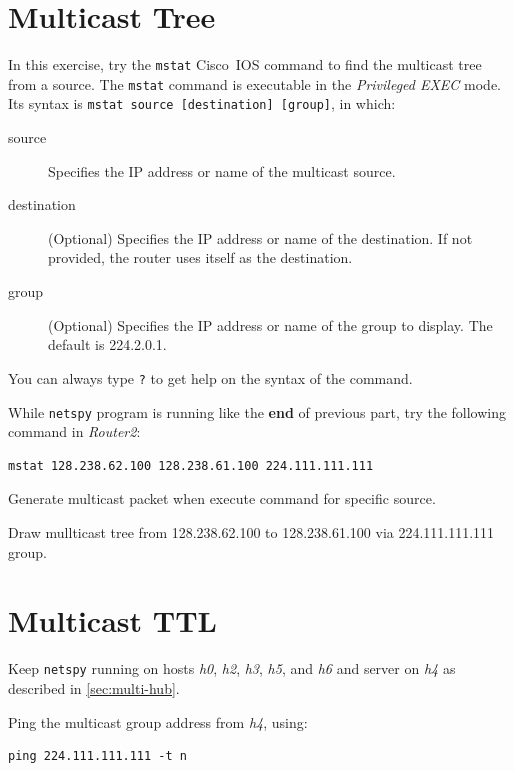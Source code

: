 \documentclass{../UTNetLab}
\begin{document}
\section{Multicast Tree}
    In this exercise, try the \lstinline[language={cisco}]{mstat} Cisco~IOS command to find the multicast tree from a source.
    The \lstinline[language={cisco}]{mstat} command is executable in the \textit{Privileged EXEC} mode.
    Its syntax is \lstinline[language={cisco}, emph={source, destination, group}]{mstat source [destination] [group]}, in which:
    \begin{description}
        \item[source] Specifies the IP address or name of the multicast source.
        \item[destination] (Optional) Specifies the IP address or name of the destination. If not provided, the router uses itself as the destination.
        \item[group] (Optional) Specifies the IP address or name of the group to display. The default is 224.2.0.1.
    \end{description}
    You can always type \lstinline[language={cisco}]{?} to get help on the syntax of the command.

    While \lstinline{netspy} program is running like the \textbf{end} of previous part, try the following command in \textit{Router2}:
    \begin{lstlisting}[language={cisco}]
mstat 128.238.62.100 128.238.61.100 224.111.111.111
    \end{lstlisting}

    Generate multicast packet when execute command for specific source.

    \begin{report}
    \item Draw mullticast tree from 128.238.62.100 to 128.238.61.100 via 224.111.111.111 group.
    \end{report}

\section{Multicast TTL}
    Keep \lstinline{netspy} running on hosts \textit{h0}, \textit{h2}, \textit{h3}, \textit{h5}, and \textit{h6} and server on \textit{h4} as described in \autoref{sec:multi-hub}.
    
    Ping the multicast group address from \textit{h4}, using: 
    \begin{lstlisting}[emph={n}]
ping 224.111.111.111 -t n
    \end{lstlisting}
\end{document}
